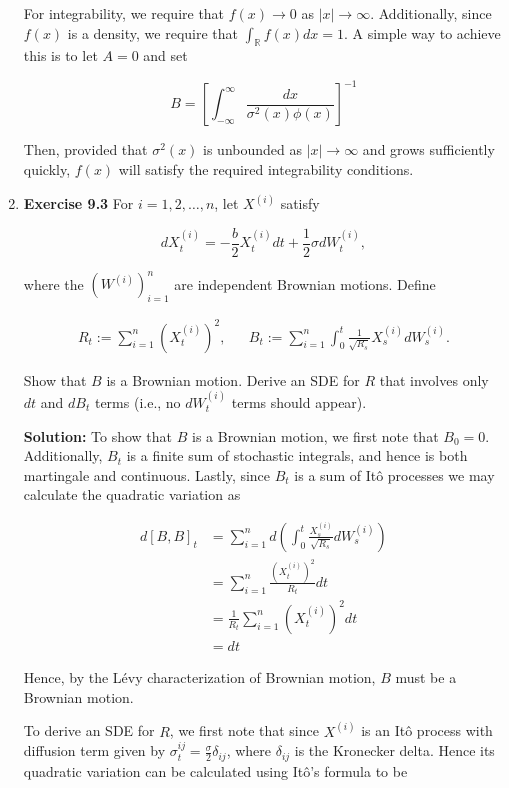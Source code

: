 \documentclass[12pt, a4paper]{article}
\begin{document}
\begin{enumerate}
    For integrability, we require that $f(x) \rightarrow 0$ as $|x| \rightarrow \infty$. Additionally, since $f(x)$ is a density, we require that $\int_{\mathbb R} f(x)dx =1$. A simple way to achieve this is to let $A=0$ and set 

    $$B = \left[ \int_{-\infty}^\infty \frac{dx}{\sigma^2(x) \phi(x)}\right]^{-1}$$

    Then, provided that $\sigma^2(x)$ is unbounded as $|x|\rightarrow \infty$ and grows sufficiently quickly, $f(x)$ will satisfy the required integrability conditions.

    \item \textbf{Exercise 9.3} For $i=1,2,\dots,n$, let $X^{(i)}$ satisfy

    $$dX_t^{(i)} = -\frac{b}{2}X_t^{(i)}dt + \frac{1}{2} \sigma dW_t^{(i)},$$

    where the $(W^{(i)})_{i=1}^n$ are independent Brownian motions. Define 

    \begin{align*}
        R_t := \sum_{i=1}^n (X_t^{(i)})^2, && B_t := \sum_{i=1}^n \int_0^t \frac{1}{\sqrt{R_s}} X_s^{(i)} dW_s^{(i)}.
    \end{align*}

    Show that $B$ is a Brownian motion. Derive an SDE for $R$ that involves only $dt$ and $dB_t$ terms (i.e., no $dW_t^{(i)}$ terms should appear).

    \textbf{Solution:} To show that $B$ is a Brownian motion, we first note that $B_0=0$. Additionally, $B_t$ is a finite sum of stochastic integrals, and hence is both martingale and continuous. Lastly, since $B_t$ is a sum of Itô processes we may calculate the quadratic variation as 

    \begin{align*}
        d[B,B]_t &= \sum_{i=1}^n d\left( \int_0^t \frac{X_s^{(i)}}{\sqrt{R_s}}dW_s^{(i)} \right) \\
        &= \sum_{i=1}^n \frac{\left(X_t^{(i)}\right)^2}{R_t} dt \\
        &= \frac{1}{R_t} \sum_{i=1}^n (X_t^{(i)})^2 dt \\
        &= dt
    \end{align*}

    Hence, by the Lévy characterization of Brownian motion, $B$ must be a Brownian motion.

    To derive an SDE for $R$, we first note that since $X^{(i)}$ is an Itô process with diffusion term given by $\sigma_t^{ij} = \frac{\sigma}{2} \delta_{ij}$, where $\delta_{ij}$ is the Kronecker delta. Hence its quadratic variation can be calculated using Itô's formula to be


\end{enumerate}
\end{document}
